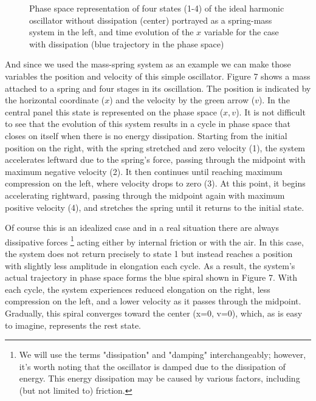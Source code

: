 \documentclass{article}
\begin{document}
\begin{figure}
    \centering
    \caption{Phase space representation of four states (1-4) of the ideal harmonic oscillator without dissipation (center) portrayed as a spring-mass system in the left, and time evolution of the $x$ variable for the case with dissipation (blue trajectory in the phase space)} 
    \label{fig_harmosc}
\end{figure}

And since we used the mass-spring system as an example we can make those variables the position and velocity of this simple oscillator. 
Figure 7 shows a mass attached to a spring and four stages in its oscillation. 
The position is indicated by the horizontal coordinate ($x$) and the velocity by the green arrow ($v$). In the central panel this state is represented on the phase space ($x,v$).
It is not difficult to see that the evolution of this system results in a cycle in phase space that closes on itself when there is no energy dissipation. 
Starting from the initial position on the right, with the spring stretched and zero velocity (1), the system accelerates leftward due to the spring’s force, passing through the midpoint with maximum negative velocity (2). It then continues until reaching maximum compression on the left, where velocity drops to zero (3). At this point, it begins accelerating rightward, passing through the midpoint again with maximum positive velocity (4), and stretches the spring until it returns to the initial state.

Of course this is an idealized case and in a real situation there are always dissipative forces \footnote{We will use the terms "dissipation" and "damping" interchangeably; however, it's worth noting that the oscillator is damped due to the dissipation of energy. This energy dissipation may be caused by various factors, including (but not limited to) friction.} acting either by internal friction or with the air.
In this case, the system does not return precisely to state 1 but instead reaches a position with slightly less amplitude in elongation each cycle. 
As a result, the system's actual trajectory in phase space forms the blue spiral shown in Figure 7. 
With each cycle, the system experiences reduced elongation on the right, less compression on the left, and a lower velocity as it passes through the midpoint. 
Gradually, this spiral converges toward the center (x=0, v=0), which, as is easy to imagine, represents the rest state.
\end{document}

